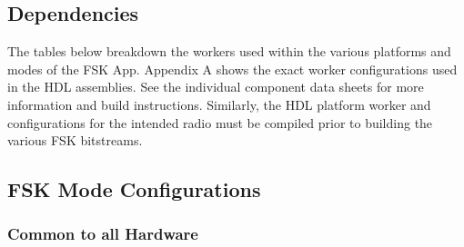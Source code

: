 \subsection{Dependencies}
\noindent The tables below breakdown the workers used within the various platforms and modes of the FSK App. Appendix A shows the exact worker configurations used in the HDL assemblies. See the individual component data sheets for more information and build instructions. Similarly, the HDL platform worker and configurations for the intended radio must be compiled prior to building the various FSK bitstreams.
\subsection{FSK Mode Configurations}
\subsubsection{Common to all Hardware}
